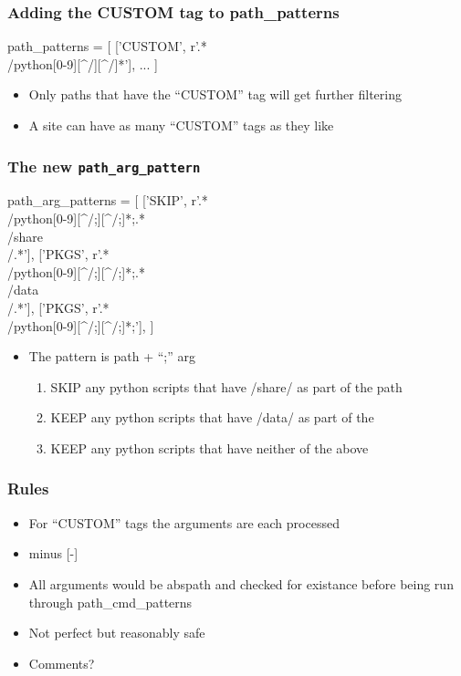 \documentclass{beamer}
\begin{document}
\begin{frame}[fragile]
    \frametitle{Adding the CUSTOM tag to path\_patterns}
 {\tiny
    \begin{semiverbatim}
path_patterns = [
    ['CUSTOM',  r'.*\\/python[0-9][^/][^/]*'],
    ...
]
    \end{semiverbatim}
}
  \begin{itemize}
    \item Only paths that have the ``CUSTOM'' tag will get further filtering
    \item A site can have as many ``CUSTOM'' tags as they like
  \end{itemize}

\end{frame}

\begin{frame}[fragile]
    \frametitle{The new \texttt{path\_arg\_pattern}}
 {\tiny
    \begin{semiverbatim}
path_arg_patterns = [
  ['SKIP', r'.*\\/python[0-9][^/;][^/;]*;.*\\/share\\/.*'],
  ['PKGS', r'.*\\/python[0-9][^/;][^/;]*;.*\\/data\\/.*'],
  ['PKGS', r'.*\\/python[0-9][^/;][^/;]*;'],
]
    \end{semiverbatim}
}
  \begin{itemize}
    \item The pattern is path + ``;'' arg
      \begin{enumerate}
        \item SKIP any python scripts that have /share/ as part of the
          path
        \item KEEP any python scripts that have /data/ as part of the
        \item KEEP any python scripts that have neither of the above
      \end{enumerate}
  \end{itemize}

\end{frame}

\begin{frame}[fragile]
    \frametitle{Rules}
 {\tiny
    \begin{semiverbatim}
    \end{semiverbatim}
}
  \begin{itemize}
    \item For ``CUSTOM'' tags the arguments are each processed
    \item 
      minus [-]
    \item All arguments would be abspath and checked for existance
      before being run through path\_cmd\_patterns
    \item Not perfect but reasonably safe
    \item Comments?
  \end{itemize}

\end{frame}
\end{document}
